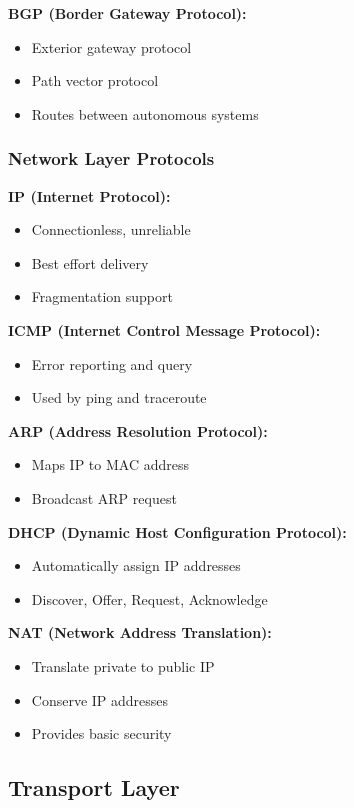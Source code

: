 \documentclass[11pt,a4paper]{article}
\begin{document}
\textbf{BGP (Border Gateway Protocol):}
\begin{itemize}
    \item Exterior gateway protocol
    \item Path vector protocol
    \item Routes between autonomous systems
\end{itemize}

\subsubsection{Network Layer Protocols}

\textbf{IP (Internet Protocol):}
\begin{itemize}
    \item Connectionless, unreliable
    \item Best effort delivery
    \item Fragmentation support
\end{itemize}

\textbf{ICMP (Internet Control Message Protocol):}
\begin{itemize}
    \item Error reporting and query
    \item Used by ping and traceroute
\end{itemize}

\textbf{ARP (Address Resolution Protocol):}
\begin{itemize}
    \item Maps IP to MAC address
    \item Broadcast ARP request
\end{itemize}

\textbf{DHCP (Dynamic Host Configuration Protocol):}
\begin{itemize}
    \item Automatically assign IP addresses
    \item Discover, Offer, Request, Acknowledge
\end{itemize}

\textbf{NAT (Network Address Translation):}
\begin{itemize}
    \item Translate private to public IP
    \item Conserve IP addresses
    \item Provides basic security
\end{itemize}

\subsection{Transport Layer}
\end{document}
